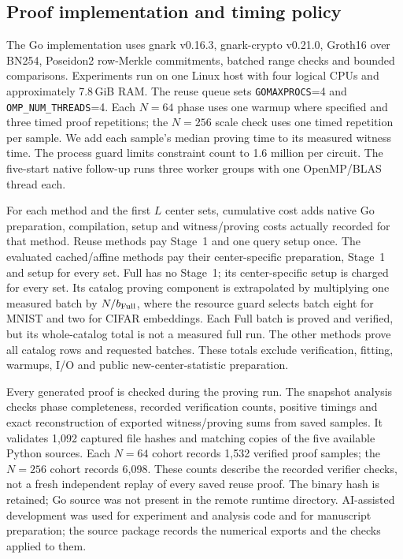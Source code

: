 \subsection{Proof implementation and timing policy}\label{sec:implementation}
The Go implementation uses gnark v0.16.3, gnark-crypto v0.21.0, Groth16 over BN254, Poseidon2 row-Merkle commitments, batched range checks and bounded comparisons. Experiments run on one Linux host with four logical CPUs and approximately 7.8\,GiB RAM. The reuse queue sets \texttt{GOMAXPROCS}=4 and \texttt{OMP\_NUM\_THREADS}=4. Each $N=64$ phase uses one warmup where specified and three timed proof repetitions; the $N=256$ scale check uses one timed repetition per sample. We add each sample's median proving time to its measured witness time. The process guard limits constraint count to 1.6 million per circuit. The five-start native follow-up runs three worker groups with one OpenMP/BLAS thread each.

For each method and the first $L$ center sets, cumulative cost adds native Go preparation, compilation, setup and witness/proving costs actually recorded for that method. Reuse methods pay Stage~1 and one query setup once. The evaluated cached/affine methods pay their center-specific preparation, Stage~1 and setup for every set. Full has no Stage~1; its center-specific setup is charged for every set. Its catalog proving component is extrapolated by multiplying one measured batch by $N/b_{\rm Full}$, where the resource guard selects batch eight for MNIST and two for CIFAR embeddings. Each Full batch is proved and verified, but its whole-catalog total is not a measured full run. The other methods prove all catalog rows and requested batches. These totals exclude verification, fitting, warmups, I/O and public new-center-statistic preparation.

Every generated proof is checked during the proving run. The snapshot analysis checks phase completeness, recorded verification counts, positive timings and exact reconstruction of exported witness/proving sums from saved samples. It validates 1,092 captured file hashes and matching copies of the five available Python sources. Each $N=64$ cohort records 1,532 verified proof samples; the $N=256$ cohort records 6,098. These counts describe the recorded verifier checks, not a fresh independent replay of every saved reuse proof. The binary hash is retained; Go source was not present in the remote runtime directory. AI-assisted development was used for experiment and analysis code and for manuscript preparation; the source package records the numerical exports and the checks applied to them.

